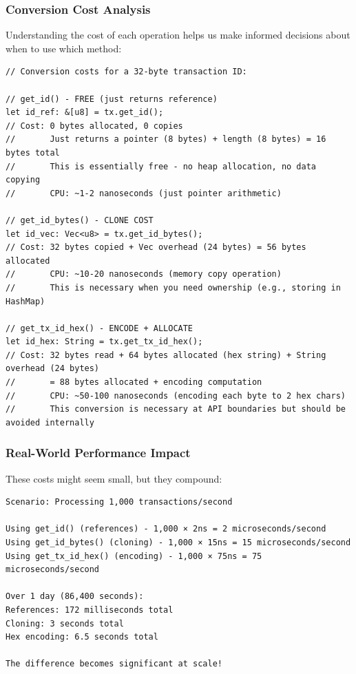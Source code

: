 \subsubsection{Conversion Cost Analysis}
\label{sec:ch06-cost-analysis}

Understanding the cost of each operation helps us make informed decisions about when to use which method:

\begin{listing}[H]
\caption{Conversion costs for transaction IDs}
\label{lst:ch06-9}
\begin{verbatim}
// Conversion costs for a 32-byte transaction ID:

// get_id() - FREE (just returns reference)
let id_ref: &[u8] = tx.get_id();
// Cost: 0 bytes allocated, 0 copies
//       Just returns a pointer (8 bytes) + length (8 bytes) = 16 bytes total
//       This is essentially free - no heap allocation, no data copying
//       CPU: ~1-2 nanoseconds (just pointer arithmetic)

// get_id_bytes() - CLONE COST
let id_vec: Vec<u8> = tx.get_id_bytes();
// Cost: 32 bytes copied + Vec overhead (24 bytes) = 56 bytes allocated
//       CPU: ~10-20 nanoseconds (memory copy operation)
//       This is necessary when you need ownership (e.g., storing in HashMap)

// get_tx_id_hex() - ENCODE + ALLOCATE
let id_hex: String = tx.get_tx_id_hex();
// Cost: 32 bytes read + 64 bytes allocated (hex string) + String overhead (24 bytes)
//       = 88 bytes allocated + encoding computation
//       CPU: ~50-100 nanoseconds (encoding each byte to 2 hex chars)
//       This conversion is necessary at API boundaries but should be avoided internally
\end{verbatim}
\end{listing}

\subsubsection{Real-World Performance Impact}
\label{sec:ch06-perf-impact}

These costs might seem small, but they compound:

\begin{verbatim}
Scenario: Processing 1,000 transactions/second

Using get_id() (references) - 1,000 × 2ns = 2 microseconds/second
Using get_id_bytes() (cloning) - 1,000 × 15ns = 15 microseconds/second
Using get_tx_id_hex() (encoding) - 1,000 × 75ns = 75 microseconds/second

Over 1 day (86,400 seconds):
References: 172 milliseconds total
Cloning: 3 seconds total
Hex encoding: 6.5 seconds total

The difference becomes significant at scale!
\end{verbatim}

